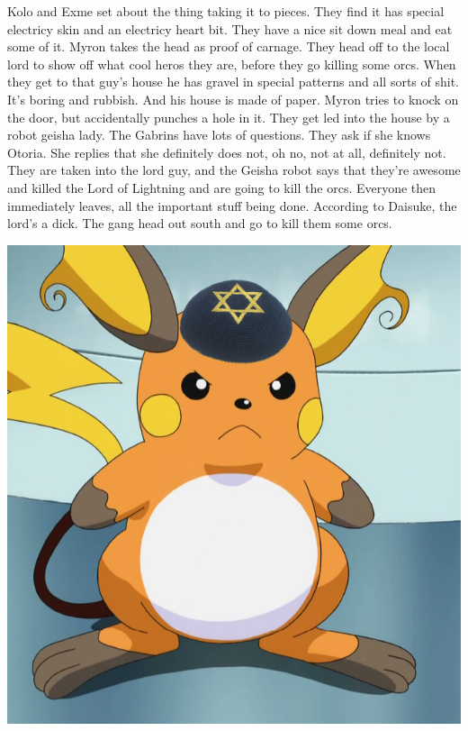 \begin{multicols}{2}
Kolo and Exme set about the thing taking it to pieces. They find it has special electricy skin and an electricy heart bit. They have a nice sit down meal and eat some of it. Myron takes the head as proof of carnage. They head off to the local lord to show off what cool heros they are, before they go killing some orcs. When they get to that guy’s house he has gravel in special patterns and all sorts of shit. It’s boring and rubbish. And his house is made of paper. Myron tries to knock on the door, but accidentally punches a hole in it. They get led into the house by a robot geisha lady. The Gabrins have lots of questions. They ask if she knows Otoria. She replies that she definitely does not, oh no, not at all, definitely not. They are taken into the lord guy, and the Geisha robot says that they’re awesome and killed the Lord of Lightning and are going to kill the orcs. Everyone then immediately leaves, all the important stuff being done. According to Daisuke, the lord’s a dick. The gang head out south and go to kill them some orcs.\medskip


\begin{center}
\includegraphics[width=\textwidth]{./content/img/raijew.png}
\begin{figure}[h]
\end{figure}
\end{center}

\end{multicols}

\vspace*{5mm}



\clearpage